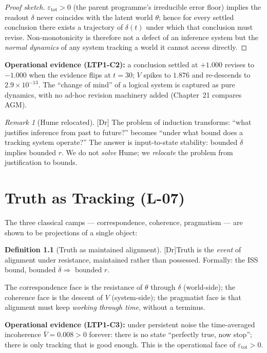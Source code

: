 \documentclass[11pt,a4paper,twoside]{book}
\newcommand{\tier}[1]{\textnormal{\small\textsf{[#1]}}}
\newcommand{\Dr}{\tier{Dr}}\newcommand{\Cj}{\tier{Cj}}\newcommand{\Wf}{\tier{Wf}}
\theoremstyle{plain}
\theoremstyle{definition}
\newtheorem{definition}[theorem]{Definition}
\theoremstyle{remark}
\newtheorem{remark}[theorem]{Remark}
\begin{document}
\begin{proof}[Proof sketch]
$\varepsilon_{\mathrm{tot}}>0$ (the parent programme's irreducible error
floor) implies the readout $\delta$ never coincides with the latent world
$\theta$; hence for every settled conclusion there exists a trajectory of
$\delta(t)$ under which that conclusion must revise. Non-monotonicity is
therefore not a defect of an inference system but the \emph{normal dynamics}
of any system tracking a world it cannot access directly.
\end{proof}

\noindent\textbf{Operational evidence (LTP1-C2):} a conclusion settled at
$+1.000$ revises to $-1.000$ when the evidence flips at $t=30$; $V$ spikes to
$1.876$ and re-descends to $2.9\times10^{-13}$. The ``change of mind'' of a
logical system is captured as pure dynamics, with no ad-hoc revision machinery
added (Chapter~21 compares AGM).

\begin{remark}[Hume relocated]\Dr
The problem of induction transforms: ``what justifies inference from past to
future?'' becomes ``under what bound does a tracking system operate?'' The
answer is input-to-state stability: bounded $\dot\delta$ implies bounded $r$.
We do not \emph{solve} Hume; we \emph{relocate} the problem from
justification to bounds.
\end{remark}

\chapter{Truth as Tracking (L-07)}

The three classical camps --- correspondence, coherence, pragmatism --- are
shown to be projections of a single object:

\begin{definition}[Truth as maintained alignment]\Dr\label{def:truth}
Truth is the \emph{event} of alignment under resistance, maintained rather
than possessed. Formally: the ISS bound, bounded $\dot\delta \Rightarrow$
bounded $r$.
\end{definition}

The correspondence face is the resistance of $\theta$ through $\delta$
(world-side); the coherence face is the descent of $V$ (system-side); the
pragmatist face is that alignment must keep \emph{working through time},
without a terminus.

\noindent\textbf{Operational evidence (LTP1-C3):} under persistent noise the
time-averaged incoherence $\bar V = 0.008 > 0$ forever: there is no state
``perfectly true, now stop''; there is only tracking that is good enough.
This is the operational face of $\varepsilon_{\mathrm{tot}}>0$.
\end{document}
